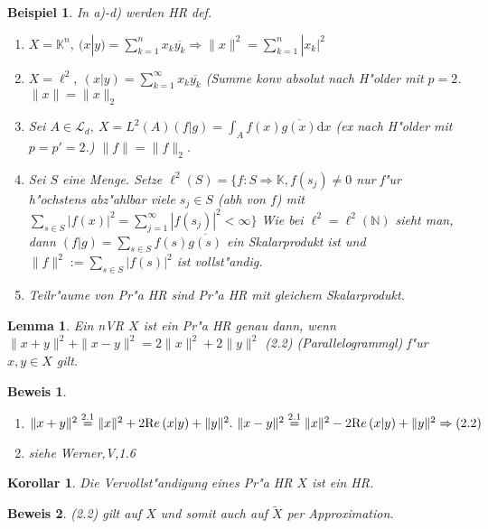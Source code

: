 \documentclass[a4paper,11pt]{book}
\newcommand{\N}{{\mathbb N}}
\newcommand{\K}{{\mathbb K}}
\newcommand{\ssL}{{\mathcal L}}
\newcommand{\re}{\ensuremath{\text Re}\,} %
\def\d{\mbox{d}}
\newtheorem{Lem}[Def]{Lemma}
\newtheorem{Kor}[Def]{Korollar}
\newtheorem{Bsp}[Def]{Beispiel}
\theoremstyle{nonumberplain}
\newtheorem{Bew}{Beweis}
\begin{document}
\begin{Bsp}
In a)-d) werden HR def.
\begin{enumerate}
\item $X = \K^n,\ (x|y) = \sum_{k=1}^n x_k \overline{y_k} \Rightarrow \|x\|^2 = \sum_{k=1}^n |x_k|^2$

\item $X = \ell^2,\ (x|y) = \sum_{k=1}^{\infty} x_k \overline{y_k}$ (Summe konv absolut nach H"older mit $p=2$. $\|x\| = \|x\|_2$

\item Sei $A \in \ssL_d,\ X = L^2(A) (f|g) = \int_A f(x) \overline{g(x)} \d x$ (ex nach H"older mit $p=p'=2$.) $\|f\|= \|f\|_2$.

\item Sei $S$ eine Menge. Setze $\ell^2(S) = \{f: S \Rightarrow \K, f(s_j) \not= 0$ nur f"ur h"ochstens abz"ahlbar viele $s_j \in S$ (abh von $f$) mit $\sum_{s \in S} |f(x)|^2 = \sum_{j=1}^{\infty} |f(s_j)|^2 < \infty \}$ Wie bei $\ell^2 = \ell^2(\N)$ sieht man, dann $(f|g) = \sum_{s \in S} f(s) \overline{g(s)}$ ein Skalarprodukt ist und $\|f\|^2 := \sum_{s \in S} |f(s)|^2$ ist vollst"andig.

\item Teilr"aume von Pr"a HR sind Pr"a HR mit gleichem Skalarprodukt.
\end{enumerate}
\end{Bsp}

\begin{Lem}
Ein nVR $X$ ist ein Pr"a HR genau dann, wenn $\|x+y\|^2 + \|x-y\|^2 = 2\|x\|^2 + 2\|y\|^2$ (2.2) (Parallelogrammgl) f"ur $x,y \in X$ gilt.
\end{Lem}


\begin{Bew}
\begin{enumerate}
\item[``$\Rightarrow$´´] $\|x+y\|^2 \stackrel{2.1}{=} \|x\|^2 + 2 \re (x|y) + \|y\|^2.\ \|x-y\|^2 \stackrel{2.1}{=} \|x\|^2 - 2 \re (x|y) + \|y\|^2 \Rightarrow (2.2)$

\item[``$\Leftarrow$´´] siehe Werner,V,1.6
\end{enumerate}
\end{Bew}

\begin{Kor}
Die Vervollst"andigung eines Pr"a HR $X$ ist ein HR.
\end{Kor}

\begin{Bew}
(2.2) gilt auf $X$ und somit auch auf $\tilde{X}$ per Approximation.
\end{Bew}
\end{document}
